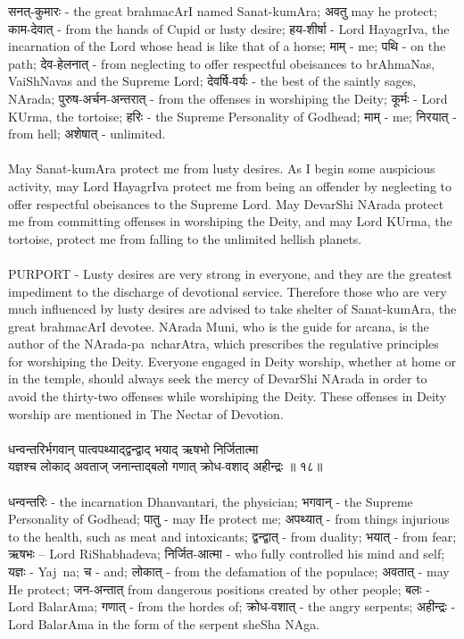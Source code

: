 सनत्-कुमारः - the great brahmacArI named Sanat-kumAra;  अवतु  may he protect;  काम-देवात् - from the hands of Cupid or lusty desire; हय-शीर्षा - Lord HayagrIva, the incarnation of the Lord whose head is like that of a horse;  माम् - me;  पथि - on the path;  देव-हेलनात् - from neglecting to offer respectful obeisances to brAhmaNas, VaiShNavas and the Supreme Lord;  देवर्षि-वर्यः - the best of the saintly sages, NArada;  पुरुष-अर्चन-अन्तरात् - from the offenses in worshiping the Deity;  कूर्मः - Lord KUrma, the tortoise;  हरिः - the Supreme Personality of Godhead;  माम् -  me;  निरयात् - from hell;  अशेषात् - unlimited.\\
\\
May Sanat-kumAra protect me from lusty desires. As I begin some auspicious activity, may Lord HayagrIva protect me from being an offender by neglecting to offer respectful obeisances to the Supreme Lord. May DevarShi NArada protect me from committing offenses in worshiping the Deity, and may Lord KUrma, the tortoise, protect me from falling to the unlimited hellish planets.\\
\\
PURPORT - Lusty desires are very strong in everyone, and they are the greatest impediment to the discharge of devotional service. Therefore those who are very much influenced by lusty desires are advised to take shelter of Sanat-kumAra, the great brahmacArI devotee. NArada Muni, who is the guide for arcana, is the author of the NArada-pa~ncharAtra, which prescribes the regulative principles for worshiping the Deity. Everyone engaged in Deity worship, whether at home or in the temple, should always seek the mercy of DevarShi NArada in order to avoid the thirty-two offenses while worshiping the Deity. These offenses in Deity worship are mentioned in The Nectar of Devotion.\\
\\
धन्वन्तरिर्भगवान् पात्वपथ्याद्द्वन्द्वाद् भयाद् ऋषभो निर्जितात्मा\\
यज्ञश्च लोकाद् अवताज् जनान्ताद्बलो गणात् क्रोध-वशाद् अहीन्द्रः ॥ १८॥\\
\\
धन्वन्तरिः - the incarnation Dhanvantari, the physician;  भगवान् - the Supreme Personality of Godhead;  पातु - may He protect me;  अपथ्यात् - from things injurious to the health, such as meat and intoxicants; द्वन्द्वात् - from duality;  भयात् - from fear;  ऋषभः – Lord RiShabhadeva;  निर्जित-आत्मा - who fully controlled his mind and self;  यज्ञः - Yaj~na;  च - and;  लोकात् - from the defamation of the populace;  अवतात् - may He protect;  जन-अन्तात्  from dangerous positions created by other people;  बलः - Lord BalarAma; गणात् - from the hordes of;  क्रोध-वशात् - the angry serpents; अहीन्द्रः - Lord BalarAma in the form of the serpent sheSha NAga.\\
